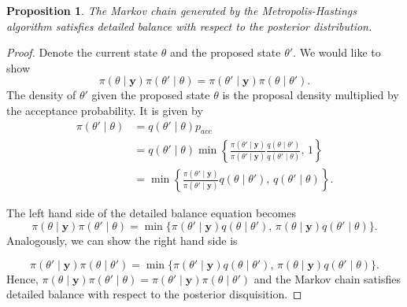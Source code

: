 \documentclass[
]{book}
\newtheorem{proposition}{Proposition}[chapter]
\theoremstyle{definition}
\theoremstyle{definition}
\theoremstyle{definition}
\theoremstyle{definition}
\theoremstyle{remark}
\begin{document}
\begin{proposition}
The Markov chain generated by the Metropolis-Hastings algorithm satisfies detailed balance with respect to the posterior distribution.
\end{proposition}

\begin{proof}
Denote the current state \(\theta\) and the proposed state \(\theta'\). We would like to show
\[
\pi(\theta \mid \boldsymbol{y}) \pi(\theta'\mid\theta) = \pi(\theta' \mid \boldsymbol{y}) \pi(\theta\mid\theta').
\]
The density of \(\theta'\) given the proposed state \(\theta\) is the proposal density multiplied by the acceptance probability. It is given by
\begin{align*}
\pi(\theta' \mid \theta) &= q(\theta' \mid \theta)p_{acc}\\
&=  q(\theta' \mid \theta)\min\left\{\frac{\pi(\theta' \mid \boldsymbol{y})}{\pi(\theta' \mid \boldsymbol{y})}\frac{q(\theta \mid \theta')}{q(\theta' \mid \theta)}, \, 1\right\} \\
& = \min\left\{\frac{\pi(\theta' \mid \boldsymbol{y})}{\pi(\theta' \mid \boldsymbol{y})}q(\theta \mid \theta'),\, q(\theta' \mid \theta)\right\}.
\end{align*}

The left hand side of the detailed balance equation becomes
\[
\pi(\theta \mid \boldsymbol{y})\pi(\theta' \mid \theta) = \min\{\pi(\theta' \mid \boldsymbol{y})q(\theta \mid \theta'),\, \pi(\theta \mid \boldsymbol{y})q(\theta' \mid \theta)\}.
\]
Analogously, we can show the right hand side is

\[
\pi(\theta' \mid \boldsymbol{y})\pi(\theta \mid \theta') = \min\{\pi(\theta' \mid \boldsymbol{y})q(\theta \mid \theta'),\, \pi(\theta \mid \boldsymbol{y})q(\theta' \mid \theta)\}.
\]
Hence, \(\pi(\theta \mid \boldsymbol{y}) \pi(\theta'\mid\theta) = \pi(\theta' \mid \boldsymbol{y}) \pi(\theta\mid\theta')\) and the Markov chain satisfies detailed balance with respect to the posterior disquisition.
\end{proof}
\end{document}

